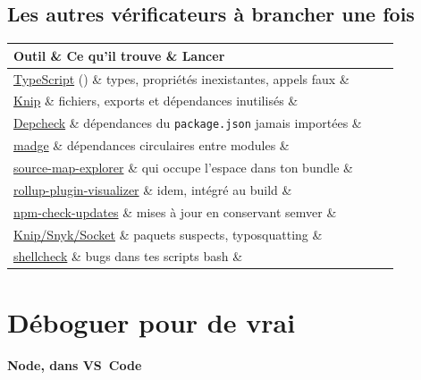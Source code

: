 \documentclass[12pt,a4paper,twoside,openright]{book}
\makeatletter
\providecommand{\cmd}[1]{}%
\renewcommand{\cmd}[1]{\srcbox{\texttt{\detokenize{#1}}}}
\newcommand{\link}[2]{\href{#2}{#1}}
\newcommand{\etape}[1]{\par\medskip\noindent\textbf{\large #1}\par\smallskip}
\newenvironment{tabz}[1]{\rowcolors{2}{white}{tralight}%
  \small\setlength{\tabcolsep}{5pt}\setlength{\LTpre}{3pt}\setlength{\LTpost}{3pt}%
  \begin{longtable}{@{}#1@{}}\toprule}
  {\bottomrule\end{longtable}\normalfont\setlength{\tabcolsep}{6pt}}
\newcommand{\thd}[1]{\textbf{\color{white}#1}}
\newcommand{\headrow}{\rowcolor{theadbg}}
\makeatother
\begin{document}
\subsection{Les autres v\'erificateurs \`a brancher une fois}

\begin{tabz}{lXl}
  \headrow \thd{Outil} \& \thd{Ce qu'il trouve} \& \thd{Lancer} \\
  \midrule
  \link{TypeScript}{https://www.typescriptlang.org/} (\cmd{tsc --noEmit}) \& types, propri\'et\'es inexistantes, appels faux \& \cmd{npm run typecheck} \\
  \link{Knip}{https://knip.dev/} \& fichiers, exports et d\'ependances inutilis\'es \& \cmd{npx knip} \\
  \link{Depcheck}{https://github.com/dpinies/depcheck} \& d\'ependances du \verb|package.json| jamais import\'ees \& \cmd{npx depcheck} \\
  \link{madge}{https://github.com/pahen/madge} \& d\'ependances circulaires entre modules \& \cmd{npx madge --circular src} \\
  \link{source-map-explorer}{https://github.com/danvk/source-map-explorer} \& qui occupe l'espace dans ton bundle \& \cmd{npx source-map-explorer dist/\/*.js} \\
  \link{rollup-plugin-visualizer}{https://github.com/btd/rollup-plugin-visualizer} \& idem, int\'egr\'e au build \& \cmd{vite build --mode analyse} \\
  \link{npm-check-updates}{https://github.com/tjun/ncu} \& mises \`a jour en conservant semver \& \cmd{npx npm-check-updates -u} \\
  \link{Knip/Snyk/Socket}{https://socket.dev/} \& paquets suspects, typosquatting \& \cmd{npx socket scan .} \\
  \link{shellcheck}{https://www.shellcheck.net/} \& bugs dans tes scripts bash \& \cmd{shellcheck scripts/*} \\
\end{tabz}

\section{D\'eboguer pour de vrai}

\etape{Node, dans VS~Code}
\end{document}
